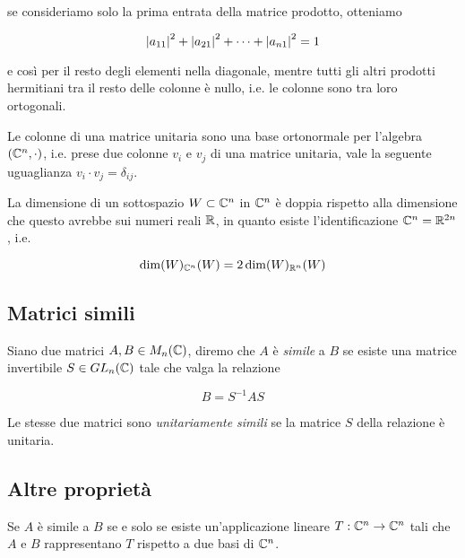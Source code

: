se consideriamo solo la prima entrata della matrice prodotto, otteniamo

\begin{equation}
	\abs{a_{11}}^{2} + \abs{a_{21}}^{2} + \cdots + \abs{a_{n1}}^{2} = 1
\end{equation}

e così per il resto degli elementi nella diagonale, mentre tutti gli altri prodotti hermitiani tra il resto delle colonne è nullo, i.e. le colonne sono tra loro ortogonali.

\begin{definition}
	Le colonne di una matrice unitaria sono una base ortonormale per l'algebra $ (\mathbb{C}^{n},\cdot) $, i.e. prese due colonne $ v_{i} $ e $ v_{j} $ di una matrice unitaria, vale la seguente uguaglianza $ v_{i} \cdot v_{j} = \delta_{ij} $.
\end{definition}


\begin{definition}
	La dimensione di un sottospazio $ W \subset \mathbb{C}^{n} $ in $ \mathbb{C}^{n} $ è doppia rispetto alla dimensione che questo avrebbe sui numeri reali $ \mathbb{R} $, in quanto esiste l'identificazione $ \mathbb{C}^{n} = \mathbb{R}^{2n} $, i.e.

	\begin{equation}
		\dim(W)_{\mathbb{C}^{n}}(W) = 2 \dim(W)_{\mathbb{R}^{n}}(W)
	\end{equation}
\end{definition}

\subsection{Matrici simili}

Siano due matrici $ A,B \in M_{n}(\mathbb{C}) $, diremo che $ A $ è \textit{simile} a $ B $ se esiste una matrice invertibile $ S \in GL_{n}(\mathbb{C}) $ tale che valga la relazione

\begin{equation}
	B = S^{-1} A S
\end{equation}

Le stesse due matrici sono \textit{unitariamente simili} se la matrice $ S $ della relazione è unitaria.

\subsection{Altre proprietà}

\begin{definition}
	Se $ A $ è simile a $ B $ se e solo se esiste un'applicazione lineare $ T : \mathbb{C}^{n} \to \mathbb{C}^{n} $ tali che $ A $ e $ B $ rappresentano $ T $ rispetto a due basi di $ \mathbb{C}^{n} $.
\end{definition}

